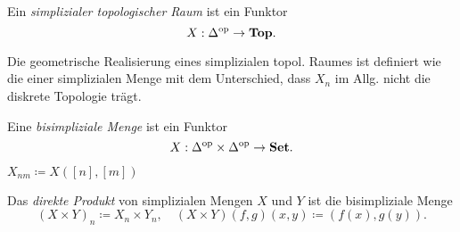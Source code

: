 \documentclass{cheat-sheet}
\begin{document}
\begin{defn}
  Ein \emph{simplizialer topologischer Raum} ist ein Funktor
  \[ X : \Delta^{\mathrm{op}} \to \mathbf{Top}. \]
\end{defn}

\begin{bem}
  Die geometrische Realisierung eines simplizialen topol. Raumes ist definiert wie die einer simplizialen Menge mit dem Unterschied, dass $X_n$ im Allg. nicht die diskrete Topologie trägt.
\end{bem}

\begin{defn}
  Eine \emph{bisimpliziale Menge} ist ein Funktor
  \[ X : \Delta^{\mathrm{op}} \times \Delta^{\mathrm{op}} \to \mathbf{Set}. \]
\end{defn}

\begin{nota}
  $X_{nm} \coloneqq X([n],[m])$
\end{nota}

\begin{bsp}
  Das \emph{direkte Produkt} von simplizialen Mengen $X$ und $Y$ ist die bisimpliziale Menge
  \[
    (X \times Y)_n \coloneqq X_n \times Y_n, \quad
    (X \times Y)(f, g)(x, y) \coloneqq (f(x), g(y)).
  \]
\end{bsp}
\end{document}
